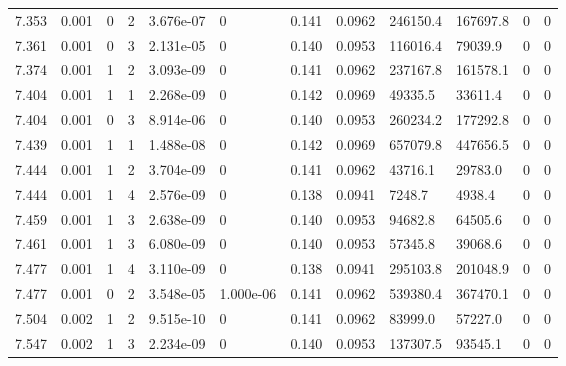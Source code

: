 \documentclass[preview]{standalone}
\begin{document}
{{{{{{{{{{\begin{tabular}{L{1.2cm}C{1.2cm} C{0.3cm}C{0.5cm} C{1.4cm}C{1.4cm} C{1.4cm}C{1.4cm} C{1.6cm}C{1.6cm} C{1.6cm}C{1.6cm}}
  7.353  &  0.001  & 0     &  2 &  3.676e-07  & 0  &  0.141&   0.0962& 246150.4 & 167697.8   &  0 & 0  \\ 
  7.361  &  0.001  & 0     &  3 &  2.131e-05  & 0  &  0.140&   0.0953& 116016.4 & 79039.9   &  0 & 0  \\ 
  7.374  &  0.001  & 1     &  2 &  3.093e-09  & 0  &  0.141&   0.0962& 237167.8 & 161578.1   &  0 & 0  \\ 
  7.404  &  0.001  & 1     &  1 &  2.268e-09  & 0  &  0.142&   0.0969& 49335.5 & 33611.4   &  0 & 0  \\ 
  7.404  &  0.001  & 0     &  3 &  8.914e-06  & 0  &  0.140&   0.0953& 260234.2 & 177292.8   &  0 & 0  \\ 
  7.439  &  0.001  & 1     &  1 &  1.488e-08  & 0  &  0.142&   0.0969& 657079.8 & 447656.5   &  0 & 0  \\ 
  7.444  &  0.001  & 1     &  2 &  3.704e-09  & 0  &  0.141&   0.0962& 43716.1 & 29783.0   &  0 & 0  \\ 
  7.444  &  0.001  & 1     &  4 &  2.576e-09  & 0  &  0.138&   0.0941& 7248.7 & 4938.4   &  0 & 0  \\ 
  7.459  &  0.001  & 1     &  3 &  2.638e-09  & 0  &  0.140&   0.0953& 94682.8 & 64505.6   &  0 & 0  \\ 
  7.461  &  0.001  & 1     &  3 &  6.080e-09  & 0  &  0.140&   0.0953& 57345.8 & 39068.6   &  0 & 0  \\ 
  7.477  &  0.001  & 1     &  4 &  3.110e-09  & 0  &  0.138&   0.0941& 295103.8 & 201048.9   &  0 & 0  \\ 
  7.477  &  0.001  & 0     &  2 &  3.548e-05  & 1.000e-06  &  0.141&   0.0962& 539380.4 & 367470.1   &  0 & 0  \\ 
  7.504  &  0.002  & 1     &  2 &  9.515e-10  & 0  &  0.141&   0.0962& 83999.0 & 57227.0   &  0 & 0  \\ 
  7.547  &  0.002  & 1     &  3 &  2.234e-09  & 0  &  0.140&   0.0953& 137307.5 & 93545.1   &  0 & 0  \\ 
\hline 
\end{tabular} 

}}}}}}}}}}
\end{document}
